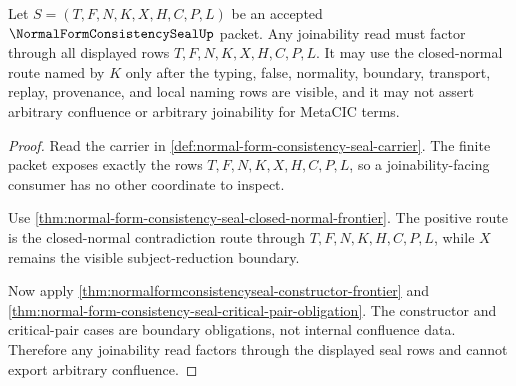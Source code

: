 \begin{theorem}
\label{thm:normal-form-consistency-seal-joinability-obligation}
Let $S=(T,F,N,K,X,H,C,P,L)$ be an accepted
$\NormalFormConsistencySealUp$ packet. Any joinability read must factor
through all displayed rows $T,F,N,K,X,H,C,P,L$. It may use the closed-normal
route named by $K$ only after the typing, false, normality, boundary,
transport, replay, provenance, and local naming rows are visible, and it may
not assert arbitrary confluence or arbitrary joinability for MetaCIC terms.
\end{theorem}
\begin{proof}
Read the carrier in
\autoref{def:normal-form-consistency-seal-carrier}. The finite packet exposes
exactly the rows $T,F,N,K,X,H,C,P,L$, so a joinability-facing consumer has no
other coordinate to inspect.

Use \autoref{thm:normal-form-consistency-seal-closed-normal-frontier}. The
positive route is the closed-normal contradiction route through
$T,F,N,K,H,C,P,L$, while $X$ remains the visible subject-reduction boundary.

Now apply \autoref{thm:normalformconsistencyseal-constructor-frontier} and
\autoref{thm:normal-form-consistency-seal-critical-pair-obligation}. The
constructor and critical-pair cases are boundary obligations, not internal
confluence data. Therefore any joinability read factors through the displayed
seal rows and cannot export arbitrary confluence.
\end{proof}

